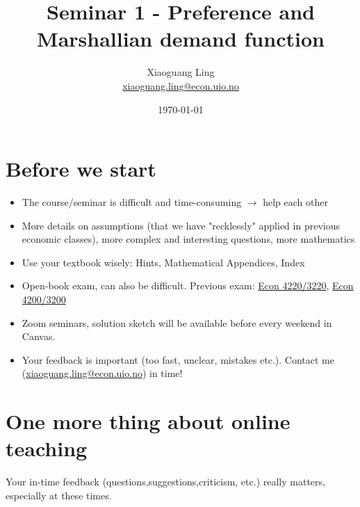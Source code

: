 \documentclass{article}
\title{Seminar 1 - Preference and Marshallian demand function}
\author{Xiaoguang Ling \\  \href{xiaoguang.ling@econ.uio.no}{xiaoguang.ling@econ.uio.no}}
\date{\today}
\begin{document}
\maketitle

\section*{Before we start}

\begin{itemize}
\item The course/seminar is difficult and time-consuming $\rightarrow$ help each other
\item More details on assumptions (that we have "recklessly" applied in previous economic classes), more complex and interesting questions, more mathematics 
\item Use your textbook wisely: Hints, Mathematical Appendices, Index
\item Open-book exam, can also be difficult. Previous exam: \href{https://www.uio.no/studier/emner/sv/oekonomi/ECON4220/previous-exams/}{Econ 4220/3220}, \href{https://www.uio.no/studier/emner/sv/oekonomi/ECON3200/previous-exams/index.html}{Econ 4200/3200}
\item Zoom seminars, solution sketch will be available before every weekend in Canvas.
\item Your feedback is important (too fast, unclear, mistakes etc.). Contact me (\href{xiaoguang.ling@econ.uio.no}{xiaoguang.ling@econ.uio.no}) in time!
\end{itemize}

\newpage

\section*{One more thing about online teaching}
Your in-time feedback (questions,suggestions,criticism, etc.) really matters, especially at these times.
\end{document}
